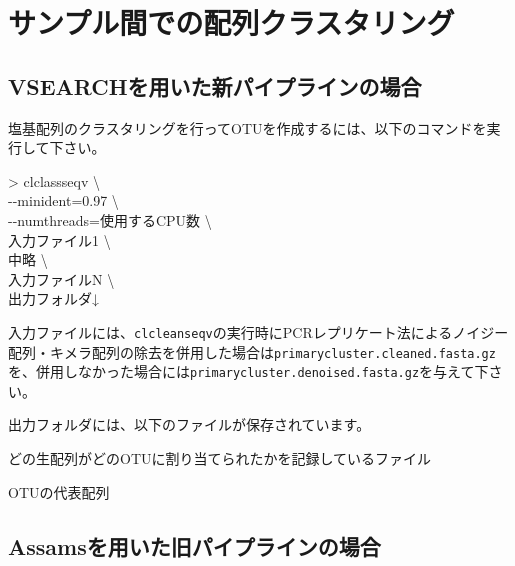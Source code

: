 \documentclass[titlepage,10pt,a4paper]{jsbook}
\newenvironment{cmd}{\begin{oframed}\raggedright\ttfamily\footnotesize\setlength{\baselineskip}{1.4em}}{\end{oframed}\vspace{-1em}}
\begin{document}
\section{サンプル間での配列クラスタリング}

\subsection{VSEARCHを用いた新パイプラインの場合}

塩基配列のクラスタリングを行ってOTUを作成するには、以下のコマンドを実行して下さい。
\begin{cmd}
{\textgreater} clclassseqv {\textbackslash}\\
{-}{-}minident=0.97 {\textbackslash}\\
{-}{-}numthreads=使用するCPU数 {\textbackslash}\\
入力ファイル1 {\textbackslash}\\
中略 {\textbackslash}\\
入力ファイルN {\textbackslash}\\
出力フォルダ↓
\end{cmd}
入力ファイルには、\texttt{clcleanseqv}の実行時にPCRレプリケート法によるノイジー配列・キメラ配列の除去を併用した場合は\texttt{primarycluster.cleaned.fasta.gz}を、併用しなかった場合には\texttt{primarycluster.denoised.fasta.gz}を与えて下さい。

出力フォルダには、以下のファイルが保存されています。
\begin{description}\small\setlength{\baselineskip}{1.1em}
\item[clustered.otu.gz] どの生配列がどのOTUに割り当てられたかを記録しているファイル
\item[clustered.fasta.gz] OTUの代表配列
\end{description}

\subsection{Assamsを用いた旧パイプラインの場合}
\end{document}
